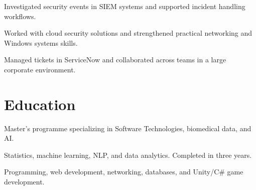 \documentclass[]{plushcv}
\begin{document}
\begin{minipage}[t]{0.70\textwidth}
\begin{tightemize}
\sectionsep
\item Investigated security events in SIEM systems and supported incident handling workflows.
\item Worked with cloud security solutions and strengthened practical networking and Windows systems skills.
\item Managed tickets in ServiceNow and collaborated across teams in a large corporate environment.
\end{tightemize}
\sectionsep

\section{Education}
Master’s programme specializing in Software Technologies, biomedical data, and AI.
\sectionsep

Statistics, machine learning, NLP, and data analytics. Completed in three years.
\sectionsep

Programming, web development, networking, databases, and Unity/C\# game development.
\sectionsep

\end{minipage}
\hfill
\end{document}
